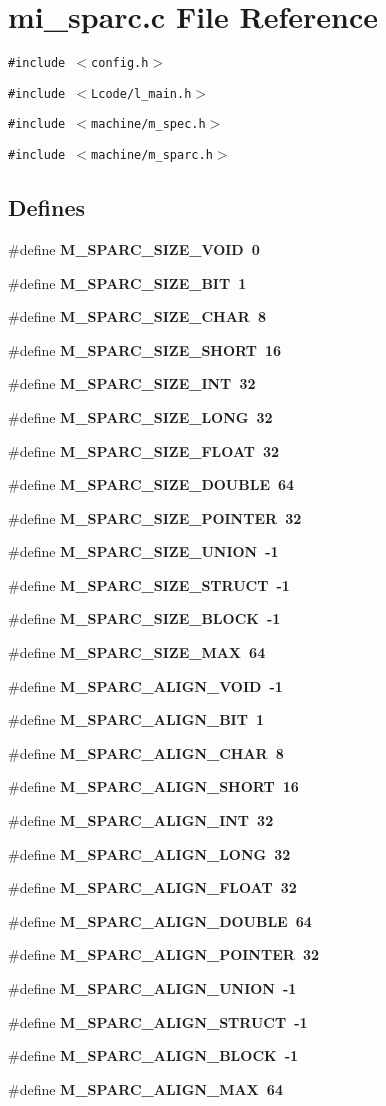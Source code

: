 \section{mi\_\-sparc.c File Reference}
\label{mi__sparc_8c}
{\tt \#include $<$config.h$>$}\par
{\tt \#include $<$Lcode/l\_\-main.h$>$}\par
{\tt \#include $<$machine/m\_\-spec.h$>$}\par
{\tt \#include $<$machine/m\_\-sparc.h$>$}\par
\subsection*{Defines}
\begin{CompactItemize}
\item 
\#define \bf{M\_\-SPARC\_\-SIZE\_\-VOID}~0
\item 
\#define \bf{M\_\-SPARC\_\-SIZE\_\-BIT}~1
\item 
\#define \bf{M\_\-SPARC\_\-SIZE\_\-CHAR}~8
\item 
\#define \bf{M\_\-SPARC\_\-SIZE\_\-SHORT}~16
\item 
\#define \bf{M\_\-SPARC\_\-SIZE\_\-INT}~32
\item 
\#define \bf{M\_\-SPARC\_\-SIZE\_\-LONG}~32
\item 
\#define \bf{M\_\-SPARC\_\-SIZE\_\-FLOAT}~32
\item 
\#define \bf{M\_\-SPARC\_\-SIZE\_\-DOUBLE}~64
\item 
\#define \bf{M\_\-SPARC\_\-SIZE\_\-POINTER}~32
\item 
\#define \bf{M\_\-SPARC\_\-SIZE\_\-UNION}~-1
\item 
\#define \bf{M\_\-SPARC\_\-SIZE\_\-STRUCT}~-1
\item 
\#define \bf{M\_\-SPARC\_\-SIZE\_\-BLOCK}~-1
\item 
\#define \bf{M\_\-SPARC\_\-SIZE\_\-MAX}~64
\item 
\#define \bf{M\_\-SPARC\_\-ALIGN\_\-VOID}~-1
\item 
\#define \bf{M\_\-SPARC\_\-ALIGN\_\-BIT}~1
\item 
\#define \bf{M\_\-SPARC\_\-ALIGN\_\-CHAR}~8
\item 
\#define \bf{M\_\-SPARC\_\-ALIGN\_\-SHORT}~16
\item 
\#define \bf{M\_\-SPARC\_\-ALIGN\_\-INT}~32
\item 
\#define \bf{M\_\-SPARC\_\-ALIGN\_\-LONG}~32
\item 
\#define \bf{M\_\-SPARC\_\-ALIGN\_\-FLOAT}~32
\item 
\#define \bf{M\_\-SPARC\_\-ALIGN\_\-DOUBLE}~64
\item 
\#define \bf{M\_\-SPARC\_\-ALIGN\_\-POINTER}~32
\item 
\#define \bf{M\_\-SPARC\_\-ALIGN\_\-UNION}~-1
\item 
\#define \bf{M\_\-SPARC\_\-ALIGN\_\-STRUCT}~-1
\item 
\#define \bf{M\_\-SPARC\_\-ALIGN\_\-BLOCK}~-1
\item 
\#define \bf{M\_\-SPARC\_\-ALIGN\_\-MAX}~64
\end{CompactItemize}
